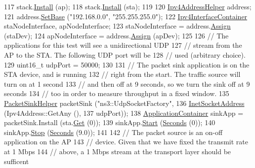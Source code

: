\begin{DoxyCode}
117   stack.\hyperlink{classns3_1_1InternetStackHelper_a6645b412f31283d2d9bc3d8a95cebbc0}{Install} (ap);
118   stack.\hyperlink{classns3_1_1InternetStackHelper_a6645b412f31283d2d9bc3d8a95cebbc0}{Install} (sta);
119 
120   \hyperlink{classns3_1_1Ipv4AddressHelper}{Ipv4AddressHelper} address;
121   address.\hyperlink{classns3_1_1Ipv4AddressHelper_acf7b16dd25bac67e00f5e25f90a9a035}{SetBase} (\textcolor{stringliteral}{"192.168.0.0"}, \textcolor{stringliteral}{"255.255.255.0"});
122   \hyperlink{classns3_1_1Ipv4InterfaceContainer}{Ipv4InterfaceContainer} staNodeInterface, apNodeInterface;
123   staNodeInterface = address.\hyperlink{classns3_1_1Ipv4AddressHelper_af8e7f4a1a7e74c00014a1eac445a27af}{Assign} (staDev);
124   apNodeInterface = address.\hyperlink{classns3_1_1Ipv4AddressHelper_af8e7f4a1a7e74c00014a1eac445a27af}{Assign} (apDev);
125 
126   \textcolor{comment}{// The applications for this test will see a unidirectional UDP}
127   \textcolor{comment}{// stream from the AP to the STA. The following UDP port will be}
128   \textcolor{comment}{// used (arbitrary choice).}
129   uint16\_t udpPort = 50000;
130 
131   \textcolor{comment}{// The packet sink application is on the STA device, and is running}
132   \textcolor{comment}{// right from the start. The traffic source will turn on at 1 second}
133   \textcolor{comment}{// and then off at 9 seconds, so we turn the sink off at 9 seconds}
134   \textcolor{comment}{// too in order to measure throughput in a fixed window.}
135   \hyperlink{classns3_1_1PacketSinkHelper}{PacketSinkHelper} packetSink (\textcolor{stringliteral}{"ns3::UdpSocketFactory"},
136                                \hyperlink{classns3_1_1InetSocketAddress}{InetSocketAddress} (Ipv4Address::GetAny (),
137                                                   udpPort));
138   \hyperlink{classns3_1_1ApplicationContainer}{ApplicationContainer} sinkApp = packetSink.Install (sta.\hyperlink{classns3_1_1NodeContainer_a9ed96e2ecc22e0f5a3d4842eb9bf90bf}{Get} (0));
139   sinkApp.\hyperlink{classns3_1_1ApplicationContainer_a8eff87926507020bbe3e1390358a54a7}{Start} (\hyperlink{group__timecivil_ga33c34b816f8ff6628e33d5c8e9713b9e}{Seconds} (0));
140   sinkApp.\hyperlink{classns3_1_1ApplicationContainer_adfc52f9aa4020c8714679b00bbb9ddb3}{Stop} (\hyperlink{group__timecivil_ga33c34b816f8ff6628e33d5c8e9713b9e}{Seconds} (9.0));
141 
142   \textcolor{comment}{// The packet source is an on-off application on the AP}
143   \textcolor{comment}{// device. Given that we have fixed the transmit rate at 1 Mbps}
144   \textcolor{comment}{// above, a 1 Mbps stream at the transport layer should be sufficent}

\end{DoxyCode}
